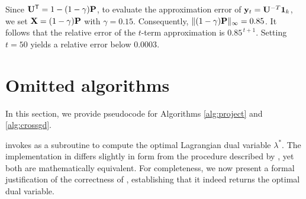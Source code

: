 
Since $\mathbf{{U}}^{\mathsf{T}} = 1 - (1 - \gamma) \mathbf{{P}}$, to evaluate the approximation error of $\mathbf{{y}}_t = \mathbf{{U}}^{-T} \mathbf{{1}}_{k}$, we set $\mathbf{X} = (1-\gamma) \mathbf{{P}}$ with $\gamma = 0.15$. Consequently, $\lVert (1-\gamma) \mathbf{{P}} \rVert_\infty = 0.85$. It follows that the relative error of the $t$-term approximation is $0.85^{\,t+1}$. Setting $t = 50$ yields a relative error below $0.0003$.






\section{Omitted algorithms}
\label{appendix:pseudocode}

In this section, we provide pseudocode for Algorithms \ref{alg:project} and \ref{alg:crossgd}. 

 invokes  as a subroutine to compute the optimal Lagrangian dual variable $\lambda^{*}$. The implementation in  differs slightly in form from the procedure described by \citet{adam2022projections}, yet both are mathematically equivalent. For completeness, we now present a formal justification of the correctness of , establishing that it indeed returns the optimal dual variable.


